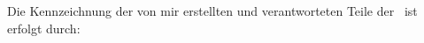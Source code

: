 Die Kennzeichnung der von mir erstellten und verantworteten Teile der \IthesisKindDE\ ist erfolgt durch:

\vspace{1.5cm}

\vspace{1cm}
\noindent\makebox[3cm]{\hrulefill} \hspace{0.1cm}
    \makebox[3cm]{\hrulefill} \hspace{0.1cm}
    \makebox[6cm]{\hrulefill} \\
\noindent{} \hspace{0.1cm}
     \hspace{0.1cm}

\clearpage
